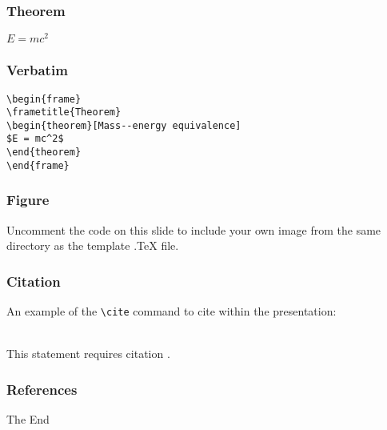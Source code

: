 \documentclass[hyperref={pdfpagelabels=false}]{beamer}
\begin{document}

\begin{frame}
\frametitle{Theorem}
\begin{theorem}
$E = mc^2$
\end{theorem}
\end{frame}


\begin{frame}[fragile] %
\frametitle{Verbatim}
\begin{example}
\begin{verbatim}
\begin{frame}
\frametitle{Theorem}
\begin{theorem}[Mass--energy equivalence]
$E = mc^2$
\end{theorem}
\end{frame}\end{verbatim}
\end{example}
\end{frame}


\begin{frame}
\frametitle{Figure}
Uncomment the code on this slide to include your own image from the same directory as the template .TeX file.
\end{frame}


\begin{frame}[fragile] %
\frametitle{Citation}
An example of the \verb|\cite| command to cite within the presentation:\\~

This statement requires citation \citet{pfenning1991logic}.
\end{frame}


\begin{frame}
\frametitle{References}



\nocite{*}

\end{frame}


\begin{frame}
\Huge{\centerline{The End}}
\end{frame}

\end{document}
